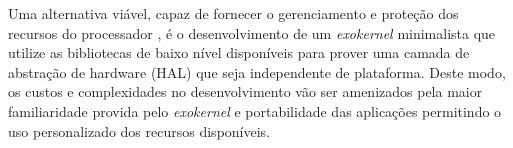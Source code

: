 \documentclass[
	12pt,				%
	openright,			%
	twoside,			%
	a4paper,			%
	english,			%
	brazil,				%
	]{abntex2}
\begin{document}
Uma alternativa viável, capaz de fornecer o gerenciamento e proteção dos recursos do processador \mppa, é o desenvolvimento de um \textit{exokernel} minimalista que utilize as bibliotecas de baixo nível disponíveis para prover uma camada de abstração de hardware (HAL)
que seja independente de plataforma.
Deste modo, os custos e complexidades no desenvolvimento vão ser amenizados pela maior familiaridade provida pelo \textit{exokernel} e portabilidade das aplicações permitindo o uso personalizado dos recursos disponíveis.







\end{document}
